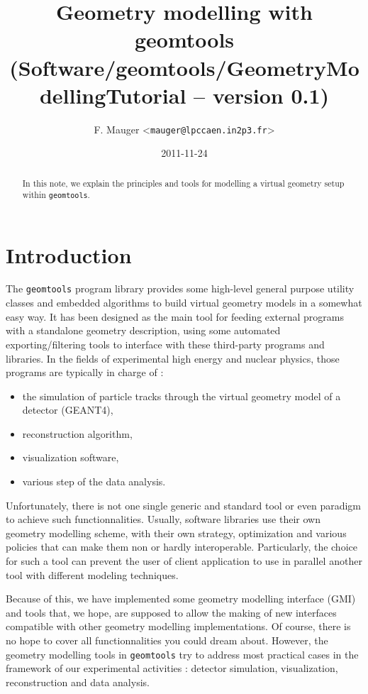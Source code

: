 \documentclass[a4paper,12pt]{article}
\title{Geometry modelling with geomtools\\%
{\small{(Software/geomtools/GeometryModellingTutorial -- version 0.1)}}}
\author{F. Mauger <\texttt{mauger@lpccaen.in2p3.fr}>}
\date{2011-11-24}
\newcommand{\pn}{\par\noindent}
\begin{document}
\maketitle

\begin{abstract}
In this note, we explain the principles and tools
for modelling a virtual geometry setup within \texttt{geomtools}.
\end{abstract}

\tableofcontents

\section{Introduction}

\pn  The \texttt{geomtools} program  library provides  some high-level
general  purpose  utility classes  and  embedded  algorithms to  build
virtual geometry models in a  somewhat easy way.  It has been designed
as  the main  tool for  feeding  external programs  with a  standalone
geometry description, using some automated exporting/filtering tools to
interface with these third-party programs and libraries. In the fields
of experimental  high energy and  nuclear physics, those  programs are
typically in charge of :
\begin{itemize}
\item the simulation of particle tracks through the
virtual  geometry model  of  a  detector  (GEANT4),  
\item reconstruction  algorithm,
\item visualization software,
\item various step of the data analysis. 
\end{itemize}
Unfortunately, there  is not one  single generic and standard  tool or
even  paradigm  to achieve  such  functionnalities. Usually,  software
libraries  use their  own geometry  modelling scheme,  with  their own
strategy, optimization and various policies  that can make them non or
hardly interoperable.   Particularly, the choice  for such a  tool can
prevent the user of client application to use in parallel another tool
with different modeling techniques.

\pn  Because of  this,  we have  implemented  some geometry  modelling
interface (GMI)  and tools  that, we hope,  are supposed to  allow the
making  of new  interfaces  compatible with  other geometry  modelling
implementations.   Of  course,  there   is  no   hope  to   cover  all
functionnalities  you  could   dream  about.   However,  the  geometry
modelling tools  in \texttt{geomtools}  try to address  most practical
cases  in the  framework  of our  experimental  activities :  detector
simulation, visualization, reconstruction and data analysis.
\end{document}
